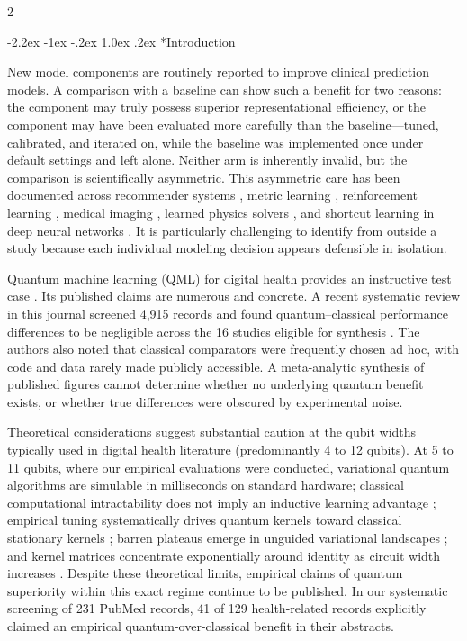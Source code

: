 \documentclass[10pt,a4paper,twoside]{article}
\makeatletter
\renewcommand{\section}{\@startsection{section}{1}{\z@}%
  {-2.2ex \@plus -1ex \@minus -.2ex}%
  {1.0ex \@plus.2ex}%
  {\normalfont\large\sffamily\bfseries\color{naturedark}}}
\makeatother
\begin{document}
\begin{multicols}{2}

\section*{Introduction}

New model components are routinely reported to improve clinical prediction models. A comparison with a baseline can show such a benefit for two reasons: the component may truly possess superior representational efficiency, or the component may have been evaluated more carefully than the baseline---tuned, calibrated, and iterated on, while the baseline was implemented once under default settings and left alone. Neither arm is inherently invalid, but the comparison is scientifically asymmetric. This asymmetric care has been documented across recommender systems \cite{rendle2019}, metric learning \cite{musgrave2020}, reinforcement learning \cite{henderson2018}, medical imaging \cite{glocker2022}, learned physics solvers \cite{kochkov2021}, and shortcut learning in deep neural networks \cite{geirhos2020}. It is particularly challenging to identify from outside a study because each individual modeling decision appears defensible in isolation.

Quantum machine learning (QML) for digital health provides an instructive test case \cite{biamonte2017}. Its published claims are numerous and concrete. A recent systematic review in this journal screened 4,915 records and found quantum--classical performance differences to be negligible across the 16 studies eligible for synthesis \cite{gupta2025}. The authors also noted that classical comparators were frequently chosen ad hoc, with code and data rarely made publicly accessible. A meta-analytic synthesis of published figures cannot determine whether no underlying quantum benefit exists, or whether true differences were obscured by experimental noise.

Theoretical considerations suggest substantial caution at the qubit widths typically used in digital health literature (predominantly 4 to 12 qubits). At 5 to 11 qubits, where our empirical evaluations were conducted, variational quantum algorithms \cite{cerezo2021} are simulable in milliseconds on standard hardware; classical computational intractability does not imply an inductive learning advantage \cite{huang2021power}; empirical tuning systematically drives quantum kernels toward classical stationary kernels \cite{kubler2021,shaydulin2022}; barren plateaus emerge in unguided variational landscapes \cite{mcclean2018}; and kernel matrices concentrate exponentially around identity as circuit width increases \cite{thanasilp2023}. Despite these theoretical limits, empirical claims of quantum superiority within this exact regime continue to be published. In our systematic screening of 231 PubMed records, 41 of 129 health-related records explicitly claimed an empirical quantum-over-classical benefit in their abstracts.


\end{multicols}
\end{document}
